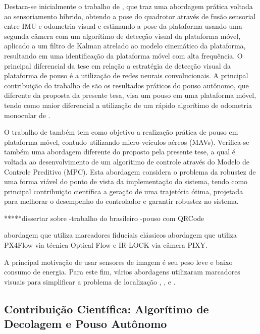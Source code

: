     Destaca-se inicialmente o trabalho de \citet{Falanga2017}, que traz uma abordagem prática voltada ao sensoriamento híbrido, obtendo a pose do quadrotor através de fusão sensorial entre IMU e odometria visual e estimando a pose da plataforma usando uma segunda câmera com um algorítimo de detecção visual da plataforma móvel, aplicado a um filtro de Kalman atrelado ao modelo cinemático da plataforma, resultando em uma identificação da plataforma móvel com alta frequência. O principal diferencial da tese em relação a estratégia de detecção visual da plataforma de pouso é a utilização de redes neurais convolucionais. A principal contribuição do trabalho de \citet{Falanga2017} são os resultados práticos do pouso autônomo, que diferente da proposta da presente tesa, visa um pouso em uma plataforma móvel, tendo como maior diferencial a utilização de um rápido algorítimo de odometria monocular de \cite{Forster2014}.
    
    O trabalho de \citet{Gilberto2016} também tem como objetivo a realização prática de pouso em plataforma móvel, contudo utilizando micro-veículos aéreos (MAVs). Verifica-se também uma abordagem diferente do proposto pela presente tese, a qual é voltada ao desenvolvimento de um algorítimo de controle através do Modelo de Controle Preditivo (MPC). Esta abordagem considera o problema da robustez de uma forma viável do ponto de vista da implementação do sistema, tendo como principal contribuição científica a geração de uma trajetória ótima, projetada para melhorar o desempenho do controlador e garantir robustez no sistema.
    
    *****dissertar sobre
    -trabalho do brasileiro
    -pouso com QRCode
    
     abordagem que utiliza marcadores fiduciais clássicos
    abordagem que utiliza PX4Flow via técnica Optical Flow e IR-LOCK via câmera PIXY. 
    
    A principal motivação de usar sensores de imagem é seu peso leve e baixo consumo de energia. Para este fim, vários abordagens utilizaram marcadores visuais para simplificar a problema de localização \cite{Jayatilleke2013}, \cite{Faigl2013}, \cite{Pestana2016} e \cite{Salinas2013}.


\subsection{Contribuição Científica: Algorítimo de Decolagem e Pouso Autônomo}

